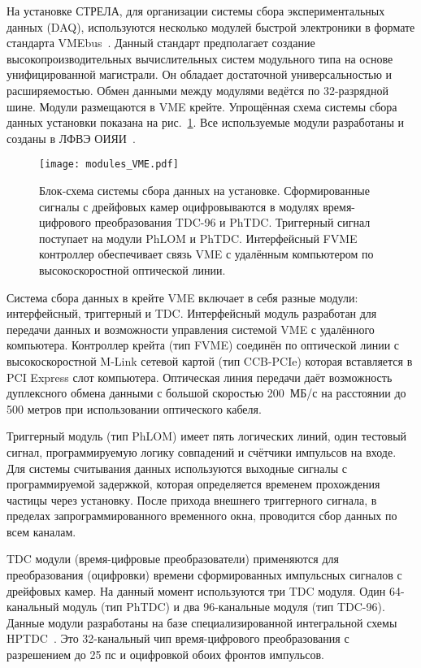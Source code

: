 На установке СТРЕЛА, для организации системы сбора экспериментальных данных
(DAQ), используются несколько модулей быстрой электроники в формате стандарта
VMEbus~\cite{vme85}. Данный стандарт предполагает \! создание
высокопроизводительных вычислительных систем модульного типа на основе
унифицированной магистрали. Он обладает достаточной универсальностью и
расширяемостью. Обмен данными между модулями ведётся по 32-разрядной шине.
Модули размещаются в VME крейте. Упрощённая схема системы сбора данных установки
показана на рис.~\ref{fig:modules_VME.pdf}. Все используемые модули разработаны
и созданы в ЛФВЭ ОИЯИ~\cite{afi_web}.

\begin{figure}[h]
  \centering
  \texttt{[image: modules\_VME.pdf]}
  \caption{Блок-схема системы сбора данных на установке. Сформированные сигналы
    с дрейфовых камер оцифровываются в модулях время-цифрового преобразования
    TDC-96 и PhTDC. Триггерный сигнал поступает на модули PhLOM и
    PhTDC. Интерфейсный FVME контроллер обеспечивает связь VME с удалённым
    компьютером по высокоскоростной оптической линии.}
  \label{fig:modules_VME.pdf}
\end{figure}

Система сбора данных в крейте VME включает в себя разные модули: интерфейсный,
триггерный и TDC. Интерфейсный модуль разработан для передачи данных и
возможности управления системой VME с удалённого компьютера. Контроллер крейта
(тип FVME) соединён по оптической линии с высокоскоростной M-Link сетевой
картой (тип CCB-PCIe) которая вставляется в PCI Express слот компьютера.
Оптическая линия передачи даёт возможность дуплексного обмена данными с большой
скоростью 200~МБ/с на расстоянии до 500 метров при использовании оптического
кабеля.

Триггерный модуль (тип PhLOM) имеет пять логических линий, один тестовый
сигнал, программируемую логику совпадений и счётчики импульсов на входе. Для
системы считывания данных используются выходные сигналы с программируемой
задержкой, которая определяется временем прохождения частицы через установку.
После прихода внешнего триггерного сигнала, в пределах запрограммированного
временного окна, проводится сбор данных по всем каналам.

TDC модули (время-цифровые преобразователи) применяются для преобразования \!
(оцифровки) времени сформированных \! импульсных сигналов с дрейфовых камер. На
данный момент используются три TDC модуля. Один 64-канальный модуль (тип PhTDC)
и два 96-канальные модуля (тип TDC-96). Данные модули разработаны на базе
специализированной интегральной схемы HPTDC~\cite{hptdc04}. Это 32-канальный чип
время-цифрового преобразования с разрешением до 25 пс и оцифровкой обоих фронтов
импульсов.

